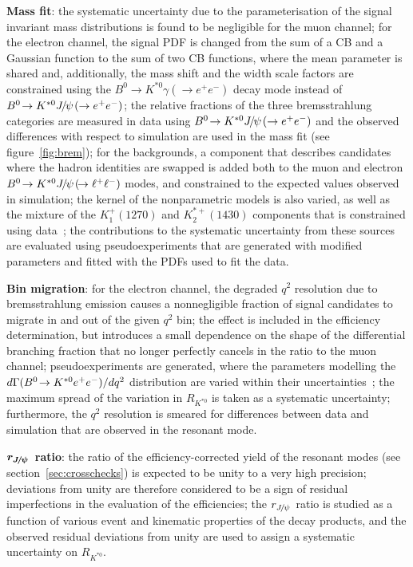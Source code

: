 \documentclass[12pt,a4paper]{article}
\def\RKst    {\mbox{R_{\Kstarz}}}
\def\Ppsi        {\ensuremath{\uppsi}\xspace}
\def\PB      {\ensuremath{\mathrm{B}}\xspace}
\def\PJ      {\ensuremath{\mathrm{J}}\xspace}
\def\PK      {\ensuremath{\mathrm{K}}\xspace}
\def\Pe      {\ensuremath{\mathrm{e}}\xspace}
\def\Ppsi        {\ensuremath{\psi}\xspace}
\def\PB      {\ensuremath{B}\xspace}
\def\PJ      {\ensuremath{J}\xspace}
\def\PK      {\ensuremath{K}\xspace}
\def\Pe      {\ensuremath{e}\xspace}
\def\epem       {\ensuremath{\Pe^+\Pe^-}\xspace}
\def\ellm       {\ensuremath{\ell^-}\xspace}
\def\ellp       {\ensuremath{\ell^+}\xspace}
\def\kaon  {\ensuremath{\PK}\xspace}
\def\Kstarz  {\ensuremath{\kaon^{*0}}\xspace}
\def\B       {\ensuremath{\PB}\xspace}
\def\Bd      {\ensuremath{\B^0}\xspace}
\def\jpsi     {\ensuremath{{\PJ\mskip -3mu/\mskip -2mu\Ppsi\mskip 2mu}}\xspace}
\newcommand{\decay}[2]{\ensuremath{#1\!\to #2}\xspace}         \def\ra                 {\ensuremath{\rightarrow}\xspace}
\def\to                 {\ensuremath{\rightarrow}\xspace}
\def\qsq       {\ensuremath{q^2}\xspace}
\def\RJPs{\ensuremath{r_{\jpsi}}\xspace}
\def\RKst{\ensuremath{R_{\Kstarz}}\xspace}
\def\ll{\ensuremath{\ellp\ellm}\xspace}
\def\Kone{\ensuremath{\kaon_{1}^{+}(1270)}\xspace}
\def\Ktwo{\ensuremath{\kaon_{2}^{*+}(1430)}\xspace}
\def\BdToKstee{\mbox{\decay{\Bd}{\Kstarz \epem}}\xspace}
\def\BdToKstGee{\mbox{\decay{\Bd}{\Kstarz \gamma(\to\epem)}}\xspace}
\def\BdToKstJPsll{\mbox{\decay{\Bd}{\Kstarz \jpsi(\decay{}{\ll})}}\xspace}
\def\BdToKstJPsee{\mbox{\decay{\Bd}{\Kstarz \jpsi(\to\epem)}}\xspace}
\begin{document}
\begin{description}
\item \textbf{Mass fit}:
the systematic uncertainty due to the parameterisation of the signal invariant mass distributions is found to be negligible for the muon channel;
for the electron channel, the signal PDF is changed from the sum of a CB and a Gaussian function to the sum of two CB functions, where the mean parameter is shared and, additionally, the mass shift and the width scale factors are constrained using the \BdToKstGee decay mode instead of \BdToKstJPsee;
the relative fractions of the three bremsstrahlung categories are measured in data using \BdToKstJPsee and the observed differences with respect to simulation are used in the mass fit (see figure~\ref{fig:brem});
for the backgrounds, a component that describes candidates where the hadron identities are swapped is added both to the muon and electron \BdToKstJPsll modes, and constrained to the expected values observed in simulation;
the kernel of the nonparametric models is also varied, as well as the mixture of the \Kone and \Ktwo components that is constrained using data~\cite{LHCb-PAPER-2014-030};
the contributions to the systematic uncertainty from these sources are evaluated using pseudoexperiments that are generated with modified parameters and fitted with the PDFs used to fit the data.

\item \textbf{Bin migration}:
for the electron channel, the degraded \qsq resolution due to bremsstrahlung emission causes a nonnegligible fraction of signal candidates to migrate in and out of the given \qsq bin;
the effect is included in the efficiency determination, but introduces a small dependence on the shape of the differential branching fraction that no longer perfectly cancels in the ratio to the muon channel;
pseudoexperiments are generated, where the parameters modelling the $d\Gamma(\BdToKstee)/d\qsq$ distribution are varied within their uncertainties~\cite{flavio};
the maximum spread of the variation in \RKst is taken as a systematic uncertainty;
furthermore, the \qsq resolution is smeared for differences between data and simulation that are observed in the resonant mode.

\item \textbf{$\boldsymbol{\RJPs}$ ratio}:
the ratio of the efficiency-corrected yield of the resonant modes (see section~\ref{sec:crosschecks}) is expected to be unity to a very high precision;
deviations from unity are therefore considered to be a sign of residual imperfections in the evaluation of the efficiencies;
the \RJPs ratio is studied as a function of various event and kinematic properties of the decay products, and the observed residual deviations from unity are used to assign a systematic uncertainty on \RKst.

\end{description}
\end{document}
